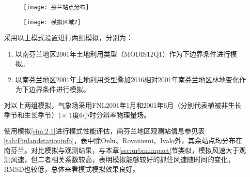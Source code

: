 \begin{figure}[!hbtp]
    \centering
    \texttt{[image: 芬兰站点分布]}
        \label{fig:Finlandstations}
\end{figure}

\begin{figure}[!hbtp]
    \centering
    \texttt{[image: 模拟区域2]}
        \label{fig:Finmodeldomain}
\end{figure}

采用以上模式设置进行两组模拟，分别为：

\begin{enumerate}

\item \label{sim:2.1} 以南芬兰地区2001年土地利用类型（MODIS12Q1）作为下边界条件进行模拟。

\item \label{sim:2.2} 以南芬兰地区2001年土地利用类型叠加2016相对2001年南芬兰地区林地变化作为下边界条件进行模拟。

\end{enumerate}

对以上两组模拟，气象场采用FNL2001年1月和2001年6月（分别代表植被非生长季节和生长季节）1$\times$ 1度6小时分辨率物理量场。

使用模拟\ref{sim:2.1}进行模式性能评估，南芬兰地区观测站信息参见表 \ref{tab:Finlandstationinfo}，表中除Oulu、Rovaniemi、Ivalo外，其余站点均分布在南芬兰。对比模拟与观测结果，与本章\ref{sec:urbanimpact}节类似，模拟风速大于观测风速，但二者相关系数较高，表明模拟能够较好的抓住风速随时间的变化，RMSD也较低，总体来看模式模拟效果良好。

